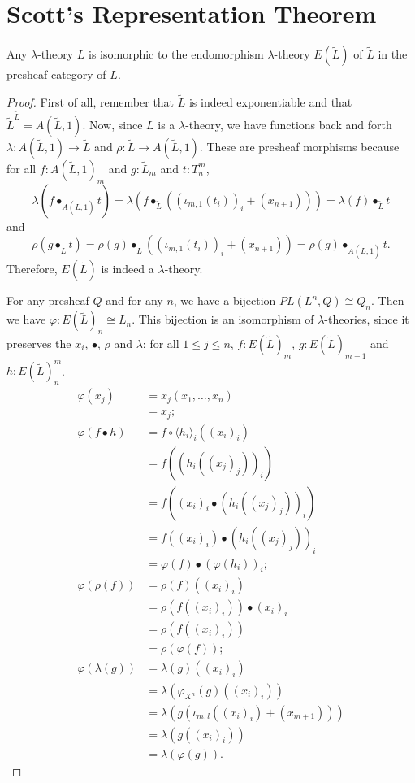 \section{Scott's Representation Theorem}
\begin{theorem}
  Any $ \lambda $-theory $ L $ is isomorphic to the endomorphism $ \lambda $-theory $ E(\tilde L) $ of $ \tilde L $ in the presheaf category of $ L $.
\end{theorem}
\begin{proof}
  First of all, remember that $ \tilde L $ is indeed exponentiable and that $ \tilde L^{\tilde L} = A(\tilde L, 1) $.
  Now, since $ L $ is a $ \lambda $-theory, we have functions back and forth $ \lambda: A(\tilde L, 1) \to \tilde L $ and $ \rho: \tilde L \to A(\tilde L, 1) $. These are presheaf morphisms because for all $ f: A(\tilde L, 1)_m $ and $ g: \tilde L_m $ and $ t: T_n^m $,
  \[ \lambda(f \bullet_{A(\tilde L, 1)} t) = \lambda(f \bullet_{\tilde L} ((\iota_{m, 1}(t_i))_i + (x_{n + 1}))) = \lambda(f) \bullet_{\tilde L} t \]
  and
  \[ \rho(g \bullet_{\tilde L} t) = \rho(g) \bullet_{\tilde L} ((\iota_{m, 1}(t_i))_i + (x_{n + 1})) = \rho(g) \bullet_{A(\tilde L, 1)} t. \]
  Therefore, $ E(\tilde L) $ is indeed a $ \lambda $-theory.

  For any presheaf $ Q $ and for any $ n $, we have a bijection $ PL(L^n, Q) \cong Q_n $.
  Then we have $ \varphi: E(\tilde L)_n \cong L_n $.
  This bijection is an isomorphism of $ \lambda $-theories, since it preserves the $ x_i $, $ \bullet $, $ \rho $ and $ \lambda $: for all $ 1 \leq j \leq n $, $ f: E(\tilde L)_m $, $ g: E(\tilde L)_{m + 1} $ and $ h: E(\tilde L)_n^m $.
  \begin{align*}
    \varphi(x_j) &= x_j(x_1, \dots, x_n)\\
    &= x_j;\\
    \varphi(f \bullet h) &= f \circ \langle h_i \rangle_i((x_i)_i)\\
    &= f((h_i((x_j)_j))_i)\\
    &= f((x_i)_i \bullet (h_i((x_j)_j))_i)\\
    &= f((x_i)_i) \bullet (h_i((x_j)_j))_i\\
    &= \varphi(f) \bullet (\varphi(h_i))_i;\\
    \varphi(\rho(f)) &= \rho(f)((x_i)_i)\\
    &= \rho(f((x_i)_i)) \bullet (x_i)_i\\
    &= \rho(f((x_i)_i))\\
    &= \rho(\varphi(f));\\
    \varphi(\lambda(g)) &= \lambda(g)((x_i)_i)\\
    &= \lambda(\varphi_{X^n}(g)((x_i)_i))\\
    &= \lambda(g(\iota_{m, l}((x_i)_i) + (x_{m + 1})))\\
    &= \lambda(g((x_i)_i))\\
    &= \lambda(\varphi(g)).
  \end{align*}
\end{proof}

